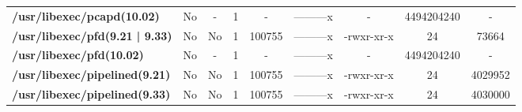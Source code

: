 \begin{center}
{\begin{tabular}{|>{\bfseries} l | C | C | C | C | C | C | C | C |}
					/usr/libexec/pcapd(10.02) & No & - & 1 & - & ---------x & - & 4494204240 & -\\ 
					/usr/libexec/pfd(9.21 | 9.33) & No & No & \color{green}1 & \color{red}100755 & \color{green}---------x & \color{red}-rwxr-xr-x & \color{green}24 & \color{red}73664\\ 
					/usr/libexec/pfd(10.02) & No & - & 1 & - & ---------x & - & 4494204240 & -\\ 
					/usr/libexec/pipelined(9.21) & No & No & \color{green}1 & \color{red}100755 & \color{green}---------x & \color{red}-rwxr-xr-x & \color{green}24 & \color{red}4029952\\ 
					/usr/libexec/pipelined(9.33) & No & No & \color{green}1 & \color{red}100755 & \color{green}---------x & \color{red}-rwxr-xr-x & \color{green}24 & \color{red}4030000\\ 

			\end{tabular}
		}
	\end{center}



